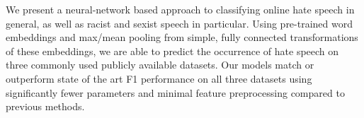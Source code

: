 We present a neural-network based approach to classifying online hate speech in general, as well as racist and sexist speech in particular. Using pre-trained word embeddings and max/mean pooling from simple, fully connected transformations of these embeddings, we are able to predict the occurrence of hate speech on three commonly used publicly available datasets. Our models match or outperform state of the art F1 performance on all three datasets using significantly fewer parameters and minimal feature preprocessing compared to previous methods.
